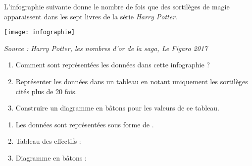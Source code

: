\begin{Maquette}[Fiche,CorrigeFin,Colonnes=2]{}
\begin{multicols}{2}
      
      \begin{exercice} %
         L'infographie suivante donne le nombre de fois que des sortilèges de magie apparaissent dans les sept livres de la série {\it Harry Potter}. \par
         \texttt{[image: infographie]} \par
         {\footnotesize\it Source : Harry Potter, les nombres d'or de la saga, Le Figaro 2017}
         \begin{enumerate}
            \item Comment sont représentées les données dans cette infographie ?
            \item Représenter les données dans un tableau en notant uniquement les sortilèges cités plus de 20 fois.
            \item Construire un diagramme en bâtons pour les valeurs de ce tableau.
         \end{enumerate}
      \end{exercice}

      \begin{Solution}
         \begin{enumerate}
            \item Les données sont représentées sous forme de .
            \item Tableau des effectifs : \par \smallskip
               {\small
                }
            \item Diagramme en bâtons : \par
         \end{enumerate}
      \end{Solution}
      


\end{multicols}
\end{Maquette}
